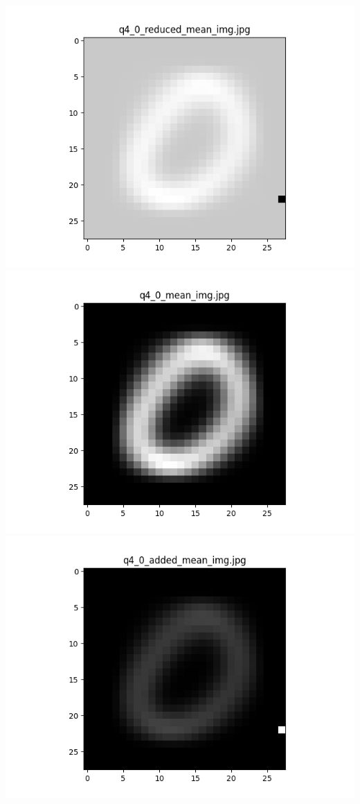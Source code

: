 \documentclass{article}
\begin{document}
    \includegraphics[scale=.37]{../results/q4/reduced_mean_images/q4_0_reduced_mean_img.png}
    \includegraphics[scale=.37]{../results/q4/mean_images/q4_0_mean_img.png}
    \includegraphics[scale=.37]{../results/q4/added_mean_images/q4_0_added_mean_img.png}
\end{document}
